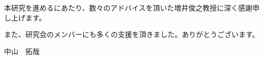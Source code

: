 \begin{acknowledgment}
本研究を進めるにあたり、数々のアドバイスを頂いた増井俊之教授に深く感謝申し上げます。

また、研究会のメンバーにも多くの支援を頂きました。ありがとうございます。
\begin{flushright}
中山　拓哉
\end{flushright}

\end{acknowledgment}

